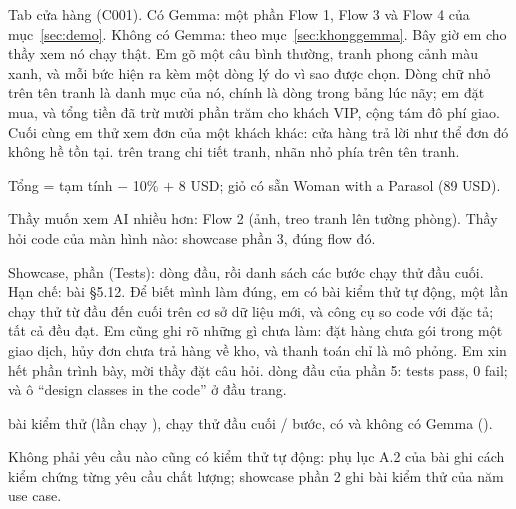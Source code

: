 {Tab cửa hàng (C001). Có Gemma: một phần Flow 1, Flow 3 và Flow 4 của mục~\ref{sec:demo}. Không có Gemma: theo mục~\ref{sec:khonggemma}.}
{Bây giờ em cho thầy xem nó chạy thật.  Em gõ một câu bình thường, tranh phong cảnh màu xanh, và mỗi bức hiện ra kèm một dòng lý do vì sao được chọn.  Dòng chữ nhỏ trên tên tranh là danh mục của nó, chính là dòng trong bảng lúc nãy; em đặt mua, và tổng tiền đã trừ mười phần trăm cho khách VIP, cộng tám đô phí giao.  Cuối cùng em thử xem đơn của một khách khác: cửa hàng trả lời như thể đơn đó không hề tồn tại.}
{trên trang chi tiết tranh, nhãn nhỏ  phía trên tên tranh.}
{\item Tổng = tạm tính $-$ 10\% $+$ 8 USD; giỏ có sẵn Woman with a Parasol (89 USD).
 \item Thầy muốn xem AI nhiều hơn: Flow 2 (ảnh, treo tranh lên tường phòng). Thầy hỏi code của màn hình nào: showcase phần 3, đúng flow đó.}

{Showcase, phần  (Tests): dòng đầu, rồi danh sách các bước chạy thử đầu cuối. Hạn chế: bài §5.12.}
{Để biết mình làm đúng, em có \factTests{} bài kiểm thử tự động, một lần chạy thử từ đầu đến cuối trên cơ sở dữ liệu mới, và công cụ so code với đặc tả; tất cả đều đạt. Em cũng ghi rõ những gì chưa làm: đặt hàng chưa gói trong một giao dịch, hủy đơn chưa trả hàng về kho, và thanh toán chỉ là mô phỏng. Em xin hết phần trình bày, mời thầy đặt câu hỏi.}
{dòng đầu của phần 5: \factTests{} tests pass, 0 fail; và ô ``design classes in the code'' ở đầu trang.}
{\item \factTests{} bài kiểm thử (lần chạy \factTestRun{}), chạy thử đầu cuối \factEtoE{}/\factEtoE{} bước, có và không có Gemma ().
 \item Không phải yêu cầu nào cũng có kiểm thử tự động: phụ lục A.2 của bài ghi cách kiểm chứng từng yêu cầu chất lượng; showcase phần 2 ghi bài kiểm thử của năm use case.}

